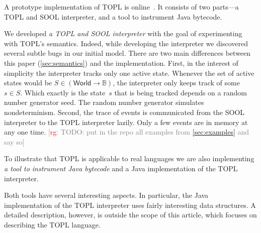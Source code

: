 \documentclass[preprint]{sigplanconf} %
\newcommand{\note}[2]{\textcolor{gray}{[\textcolor{red}{#1}: #2]}}
\newcommand{\rg}[1]{\note{rg}{#1}}
\newcommand{\B}{\ensuremath{\mathbb{B}}}
\newcommand{\set}[1]{\ensuremath{\mathsf{#1}}}
\theoremstyle{definition}
\theoremstyle{remark}
\begin{document}
A prototype implementation of TOPL is online~\cite{web:topl.prototype}.
It consists of two parts---a TOPL and SOOL interpreter, and a tool to instrument Java bytecode.

We developed \emph{a TOPL and SOOL interpreter} with the goal of experimenting with TOPL's semantics.
Indeed, while developing the interpreter we discovered several subtle bugs in our initial model.
There are two main differences between this paper (\autoref{sec:semantics}) and the implementation.
First, in the interest of simplicity the interpreter tracks only one active state.
Whenever the set of active states would be $S\in(\set{World}\to\B)$, the interpreter only keeps track of some $s\in S$.
Which exactly is the state~$s$ that is being tracked depends on a random number generator seed.
The random number generator simulates nondeterminism.
Second, the trace of events is communicated from the SOOL interpreter to the TOPL interpreter lazily.
Only a few events are in memory at any one time.
\rg{TODO: put in the repo all examples from \autoref{sec:examples} and say so}

To illustrate that TOPL is applicable to real languages we are also implementing \emph{a tool to instrument Java bytecode} and a Java implementation of the TOPL interpreter.

Both tools have several interesting aspects.
In particular, the Java implementation of the TOPL interpreter uses fairly interesting data structures.
A detailed description, however, is outside the scope of this article, which focuses on describing the TOPL language.

\end{document}
